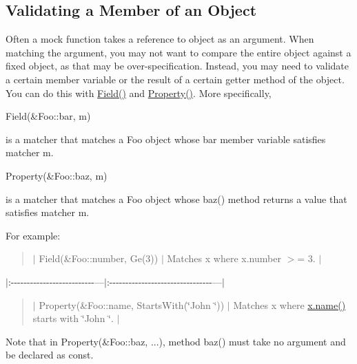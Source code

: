 \subsection*{Validating a Member of an Object}

Often a mock function takes a reference to object as an argument. When matching the argument, you may not want to compare the entire object against a fixed object, as that may be over-\/specification. Instead, you may need to validate a certain member variable or the result of a certain getter method of the object. You can do this with {\ttfamily \hyperlink{namespacetesting_a4df3849391696aa93ac3a7703a717c2a}{Field()}} and {\ttfamily \hyperlink{namespacetesting_a0fad10571e23f7bc0d5c83d4c31ba740}{Property()}}. More specifically,


\begin{DoxyCode}
Field(&Foo::bar, m)
\end{DoxyCode}


is a matcher that matches a {\ttfamily Foo} object whose {\ttfamily bar} member variable satisfies matcher {\ttfamily m}.


\begin{DoxyCode}
Property(&Foo::baz, m)
\end{DoxyCode}


is a matcher that matches a {\ttfamily Foo} object whose {\ttfamily baz()} method returns a value that satisfies matcher {\ttfamily m}.

For example\+:

\begin{quote}
$\vert$ {\ttfamily Field(\&\+Foo\+::number, Ge(3))} $\vert$ Matches {\ttfamily x} where {\ttfamily x.\+number $>$= 3}. $\vert$ \end{quote}
$\vert$\+:-\/-\/-\/-\/-\/-\/-\/-\/-\/-\/-\/-\/-\/-\/-\/-\/-\/-\/-\/-\/-\/-\/-\/-\/-\/-\/---$\vert$\+:-\/-\/-\/-\/-\/-\/-\/-\/-\/-\/-\/-\/-\/-\/-\/-\/-\/-\/-\/-\/-\/-\/-\/-\/-\/-\/-\/-\/-\/-\/-\/-\/---$\vert$ \begin{quote}
$\vert$ {\ttfamily Property(\&Foo\+::name, Starts\+With(\char`\"{}\+John \char`\"{}))} $\vert$ Matches {\ttfamily x} where {\ttfamily \hyperlink{namespaceinteractive__marker_a447655961b3d3ca3c5a2a9d3d769436d}{x.\+name()}} starts with {\ttfamily \char`\"{}\+John \char`\"{}}. $\vert$ \end{quote}


Note that in {\ttfamily Property(\&Foo\+::baz, ...)}, method {\ttfamily baz()} must take no argument and be declared as {\ttfamily const}.

